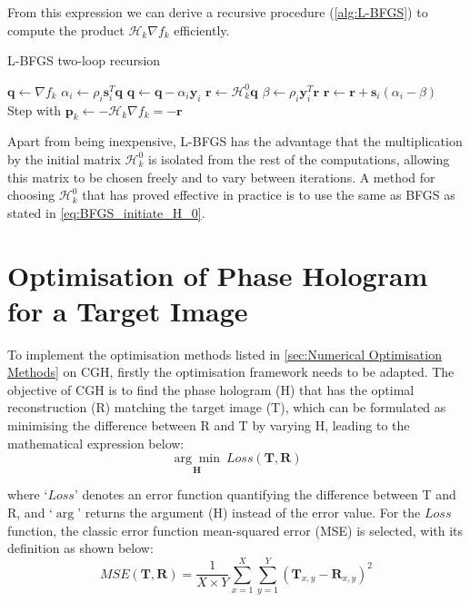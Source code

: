 From this expression we can derive a recursive procedure (\cref{alg:L-BFGS}) to compute the product $\mathcal{H}_{k} \nabla f_k$ efficiently.

\begin{algorithm}[H]
  \caption{L-BFGS two-loop recursion \cite{Nocedal2006}}\label{alg:L-BFGS}
  \begin{algorithmic}
    \State $\textbf{q} \gets \nabla f_k$
    \State $\alpha_i \gets \rho_i \textbf{s}_i^T \textbf{q}$
    \State $ \textbf{q} \gets \textbf{q} - \alpha_i\textbf{y}_i$
    \EndFor
    \State $\textbf{r}\gets \mathcal{H}_k^0 \textbf{q}$
    \State $\beta \gets \rho_i \textbf{y}_i^T \textbf{r}$
    \State $ \textbf{r} \gets \textbf{r} +\textbf{s}_i (\alpha_i-\beta)$
    \EndFor
    \State Step with $\textbf{p}_k \gets -\mathcal{H}_k \nabla f_{k} = -\textbf{r}$
  \end{algorithmic}
\end{algorithm}

Apart from being inexpensive, L-BFGS has the advantage that the multiplication by the initial matrix $\mathcal{H}_k^0$ is isolated from the rest of the computations, allowing this matrix to be chosen freely and to vary between iterations. A method for choosing $\mathcal{H}_k^0$ that has proved effective in practice is to use the same as BFGS as stated in \cref{eq:BFGS_initiate_H_0}. \cite{Nocedal2006}



\section{Optimisation of Phase Hologram for a Target Image} \label{sec:Optimisation of Phase Hologram for a Target Image}

To implement the optimisation methods listed in \cref{sec:Numerical Optimisation Methods} on CGH, firstly the optimisation framework needs to be adapted. The objective of CGH is to find the phase hologram (H) that has the optimal reconstruction (R) matching the target image (T), which can be formulated as minimising the difference between R and T by varying H, leading to the mathematical expression below:
\begin{equation}
	\underset{\textbf{H}}{\arg \min}\ Loss(\textbf{T}, \textbf{R})
\end{equation}

where `$Loss$' denotes an error function quantifying the difference between T and R, and `$\arg$' returns the argument (H) instead of the error value. For the $Loss$ function, the classic error function mean-squared error (MSE) \cite{MSE_REF} is selected, with its definition as shown below:
\begin{equation}
  MSE(\textbf{T}, \textbf{R}) = \frac{1}{X\times Y} \sum_{x=1}^{X} \sum_{y=1}^{Y} (\textbf{T}_{x,y}-\textbf{R}_{x,y})^2
  \label{eq:MSE}
\end{equation}

